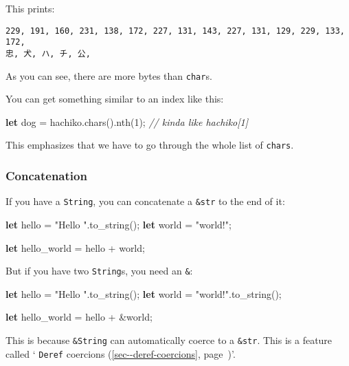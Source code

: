 \documentclass[a4paper,]{book}
\renewcommand*{\hyperref}[2][\ar]{%
  \def\ar{#2}%
  #2 (\autoref{#1}, page~\pageref{#1})}
\newenvironment{Shaded}{\begin{snugshade}}{\end{snugshade}}
\newcommand{\KeywordTok}[1]{\textcolor[rgb]{0.13,0.29,0.53}{\textbf{{#1}}}}
\newcommand{\DecValTok}[1]{\textcolor[rgb]{0.00,0.00,0.81}{{#1}}}
\newcommand{\StringTok}[1]{\textcolor[rgb]{0.31,0.60,0.02}{{#1}}}
\newcommand{\CommentTok}[1]{\textcolor[rgb]{0.56,0.35,0.01}{\textit{{#1}}}}
\newcommand{\NormalTok}[1]{{#1}}
\begin{document}
This prints:

\begin{verbatim}
229, 191, 160, 231, 138, 172, 227, 131, 143, 227, 131, 129, 229, 133, 172, 
忠, 犬, ハ, チ, 公, 
\end{verbatim}

As you can see, there are more bytes than \texttt{char}s.

You can get something similar to an index like this:

\begin{Shaded}
\begin{Highlighting}[]
\KeywordTok{let} \NormalTok{dog = hachiko.chars().nth(}\DecValTok{1}\NormalTok{); }\CommentTok{// kinda like hachiko[1]}
\end{Highlighting}
\end{Shaded}

This emphasizes that we have to go through the whole list of
\texttt{chars}.

\subsubsection{Concatenation}\label{concatenation}

If you have a \texttt{String}, you can concatenate a \texttt{\&str} to
the end of it:

\begin{Shaded}
\begin{Highlighting}[]
\KeywordTok{let} \NormalTok{hello = }\StringTok{"Hello "}\NormalTok{.to_string();}
\KeywordTok{let} \NormalTok{world = }\StringTok{"world!"}\NormalTok{;}

\KeywordTok{let} \NormalTok{hello_world = hello + world;}
\end{Highlighting}
\end{Shaded}

But if you have two \texttt{String}s, you need an \texttt{\&}:

\begin{Shaded}
\begin{Highlighting}[]
\KeywordTok{let} \NormalTok{hello = }\StringTok{"Hello "}\NormalTok{.to_string();}
\KeywordTok{let} \NormalTok{world = }\StringTok{"world!"}\NormalTok{.to_string();}

\KeywordTok{let} \NormalTok{hello_world = hello + &world;}
\end{Highlighting}
\end{Shaded}

This is because \texttt{\&String} can automatically coerce to a
\texttt{\&str}. This is a feature called
`\hyperref[sec--deref-coercions]{\texttt{Deref} coercions}'.
\end{document}
